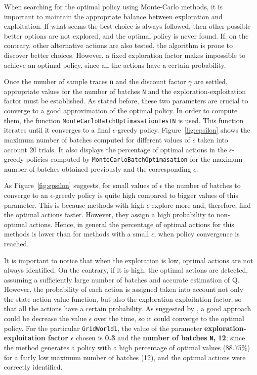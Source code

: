 \documentclass[10pt]{article}   	%
\begin{document}
When searching for the optimal policy using Monte-Carlo methods, it is important to maintain the appropriate balance between exploration and exploitation. If what seems the best choice is always followed, then other possible better options are not explored, and the optimal policy is never found. If, on the contrary, other alternative actions are also tested, the algorithm is prone to discover better choices. However, a  fixed exploration factor makes impossible to achieve an optimal policy, since all the actions have a certain probability.

Once the number of sample traces \texttt{n} and the discount factor $\gamma$ are settled, appropriate values for the number of batches \texttt{N} and the exploration-exploitation factor must be established. As stated before, these two parameters are crucial to converge to a good approximation of the optimal policy. In order to compute them, the function \texttt{MonteCarloBatchOptimasationTestN} is used. This function iterates until it converges to a final $\epsilon$-greedy policy. Figure~\ref{fig:epsilon} shows the maximum number of batches computed for different values of $\epsilon$ taken into account 20 trials. It also displays the percentage of optimal actions in the $\epsilon$-greedy policies computed by \texttt{MonteCarloBatchOptimasation} for the maximum number of batches obtained previously and the corresponding $\epsilon$.

As Figure~\ref{fig:epsilon} suggests, for small values of $\epsilon$ the number of batches to converge to an $\epsilon$-greedy policy is quite high compared to bigger values of this parameter. This is because methods with high $\epsilon$ explore more and, therefore, find the optimal actions faster. However, they assign a high probability to non-optimal actions. Hence, in general the percentage of optimal actions for this methods is lower than for methods with a small $\epsilon$, when policy convergence is reached.

It is important to notice that when the exploration is low, optimal actions are not always identified. On the contrary, if it is high, the optimal actions are detected, assuming a sufficiently large number of batches and accurate estimation of Q. However, the probability of each action is assigned taken into account not only the state-action value function, but also the exploration-exploitation factor, so that all the actions have a certain probability. As suggested by \cite{sutton}, a good approach could be decrease the value $\epsilon$ over the time, so it could converge to the optimal policy. For the particular \texttt{GridWorld1}, the value of the parameter \textbf{ exploration-exploitation factor $\epsilon$} chosen is \textbf{0.3} and the \textbf{number of batches \texttt{N}, 12}; since the method generates a policy with a high percentage of optimal values (88.75$\%$) for a fairly low maximum number of batches (12), and the optimal actions were correctly identified.
\end{document}
